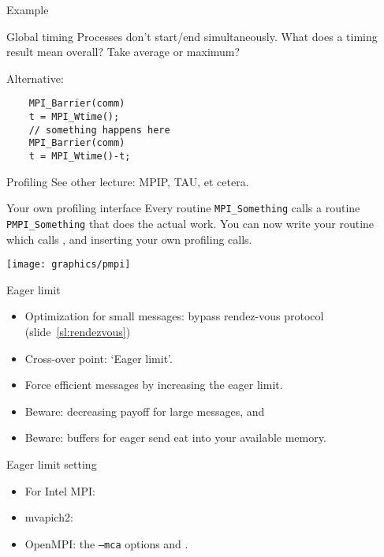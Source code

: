 \begin{numberedframe}{Example}
\end{numberedframe}

\begin{numberedframe}{Global timing}
  Processes don't start/end simultaneously. What does a timing result
  mean overall? Take average or maximum?

  Alternative:
\begin{lstlisting}
    MPI_Barrier(comm)
    t = MPI_Wtime();
    // something happens here
    MPI_Barrier(comm)
    t = MPI_Wtime()-t;
\end{lstlisting}
\end{numberedframe}

\begin{numberedframe}{Profiling}
  See other lecture: 
  MPIP, TAU, et cetera.
\end{numberedframe}

\begin{numberedframe}{Your own profiling interface}
  Every routine \lstinline{MPI_Something} calls a routine \lstinline{PMPI_Something} that 
  does the actual work. You can now write your  routine
  which calls , and inserting your own profiling calls.

  \texttt{[image: graphics/pmpi]}
\end{numberedframe}


\begin{numberedframe}{Eager limit}
  \begin{itemize}
  \item Optimization for small messages: bypass rendez-vous protocol
    (slide~\ref{sl:rendezvous})
  \item Cross-over point: `Eager limit'.
  \item Force efficient messages by increasing the eager limit.
  \item Beware: decreasing payoff for large messages, and
  \item Beware: buffers for eager send eat into your available memory.
  \end{itemize}
\end{numberedframe}

\begin{numberedframe}{Eager limit setting}
    \begin{itemize}
    \item For Intel MPI: 
    \item mvapich2: 
    \item OpenMPI:  the
      \texttt{--mca} options  and
      .
    \end{itemize}
\end{numberedframe}

